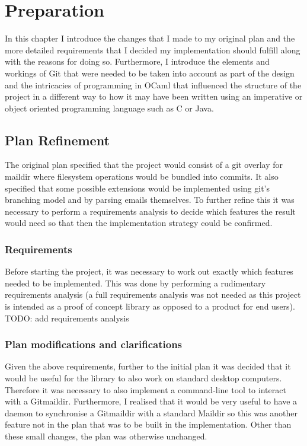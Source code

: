 \chapter{Preparation}

In this chapter I introduce the changes that I made to my original plan and the more detailed requirements that I decided my implementation should fulfill along with the reasons for doing so. Furthermore, I introduce the elements and workings of Git that were needed to be taken into account as part of the design and the intricacies of programming in OCaml that influenced the structure of the project in a different way to how it may have been written using an imperative or object oriented programming language such as C or Java.

\section{Plan Refinement}

The original plan specified that the project would consist of a git overlay for maildir where filesystem operations would be bundled into commits. It also specified that some possible extensions would be implemented using git's branching model and by parsing emails themselves. To further refine this it was necessary to perform a requirements analysis to decide which features the result would need so that then the implementation strategy could be confirmed.

\subsection{Requirements}

Before starting the project, it was necessary to work out exactly which features needed to be implemented. This was done by performing a rudimentary requirements analysis (a full requirements analysis was not needed as this project is intended as a proof of concept library as opposed to a product for end users). TODO: add requirements analysis

\subsection{Plan modifications and clarifications}

Given the above requirements, further to the initial plan it was decided that it would be useful for the library to also work on standard desktop computers. Therefore it was necessary to also implement a command-line tool to interact with a Gitmaildir. Furthermore, I realised that it would be very useful to have a daemon to synchronise a Gitmaildir with a standard Maildir so this was another feature not in the plan that was to be built in the implementation. Other than these small changes, the plan was otherwise unchanged.

